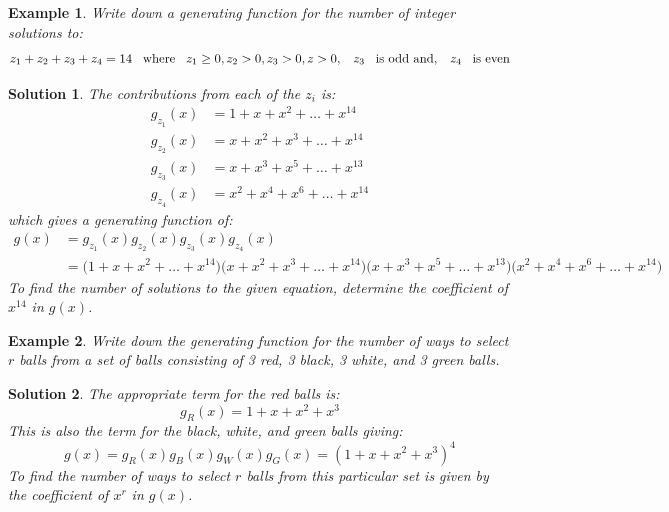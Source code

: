 \documentclass[12pt, letterpaper, onecolumn, conference, final]{IEEEtran}
\theoremstyle{definition}
\theoremstyle{plain}
\newtheorem{example}{Example}[section]
\newtheorem{solution}{Solution}[section]
\begin{document}
\begin{example}
Write down a generating function for the number of integer solutions to:
\begin{equation*}
z_1 + z_2 + z_3 + z_4 = 14 \hspace{.3cm} \text{where} \hspace{.3cm} z_1 \geq 0, z_2 > 0, z_3 > 0, z > 0, \hspace{.3cm} z_3 \hspace{.3cm} \text{is odd and}, \hspace{.3cm} z_4 \hspace{.3cm} \text{is even}
\end{equation*}
\end{example}

\newpage
\begin{solution}
The contributions from each of the $z_i$ is:
\begin{equation*}
\begin{split}
g_{z_1}(x) &= 1 + x + x^2 + \dots + x^{14} \\
g_{z_2}(x) &= x + x^2 + x^3 + \dots + x^{14} \\
g_{z_3}(x) &= x + x^3 + x^5 + \dots + x^{13} \\
g_{z_4}(x) &= x^2 + x^4 + x^6 + \dots + x^{14}
\end{split}
\end{equation*}
which gives a generating function of:
\begin{equation*}
\begin{split}
g(x) &= g_{z_1}(x) g_{z_2}(x) g_{z_3}(x) g_{z_4}(x) \\
&= \Big( 1 + x + x^2 + \dots + x^{14} \Big) \Big( x + x^2 + x^3 + \dots + x^{14} \Big) \Big( x + x^3 + x^5 + \dots + x^{13} \Big) \Big( x^2 + x^4 + x^6 + \dots + x^{14} \Big)
\end{split}
\end{equation*}
To find the number of solutions to the given equation, determine the coefficient of $x^{14}$ in $g(x)$.
\end{solution}

\begin{example}
Write down the generating function for the number of ways to select $r$ balls from a set of balls consisting of 3 red, 3 black, 3 white, and 3 green balls.
\end{example}
\begin{solution}
The appropriate term for the red balls is:
\begin{equation*}
g_R(x) = 1 + x + x^2 + x^3
\end{equation*}
This is also the term for the black, white, and green balls giving:
\begin{equation*}
g(x) = g_R(x) g_B(x) g_W(x) g_G(x) = (1 + x + x^2 + x^3)^4
\end{equation*}
To find the number of ways to select $r$ balls from this particular set is given by the coefficient of $x^r$ in $g(x)$.
\end{solution}
\end{document}
